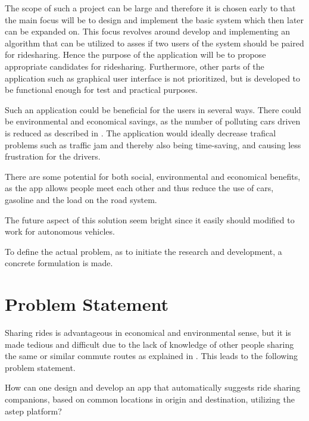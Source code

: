 The scope of such a project can be large and therefore it is chosen early to that the main focus will be to design and implement the basic system which then later can be expanded on.
This focus revolves around develop and implementing an algorithm that can be utilized to asses if two users of the system should be paired for ridesharing.
Hence the purpose of the application will be to propose appropriate candidates for ridesharing.
Furthermore, other parts of the application such as graphical user interface is not prioritized, but is developed to be functional enough for test and practical purposes.

Such an application could be beneficial for the users in several ways. There could be environmental and economical savings, as the number of polluting cars driven is reduced as described in \cite{doi:10.1080/01441647.2011.621557}. The application would ideally decrease trafical problems such as traffic jam and thereby also being time-saving, and causing less frustration for the drivers.

There are some potential for both social, environmental and economical benefits, as the app allows people meet each other and thus reduce the use of cars, gasoline and the load on the road system.

The future aspect of this solution seem bright since it easily should modified to work for autonomous vehicles.

To define the actual problem, as to initiate the research and development, a concrete formulation is made.
\section{Problem Statement}
Sharing rides is advantageous in economical and environmental sense, but it is made tedious and difficult due to the lack of knowledge of other people sharing the same or similar commute routes as explained in \cite{doi:10.1080/01441647.2011.621557}. This leads to the following problem statement.

{\addtolength{\leftskip}{10mm}\addtolength{\rightskip}{10mm}\noindent\hrulefill\it

\noindent How can one design and develop an app that automatically suggests ride sharing companions, based on common locations in origin and destination, utilizing the \gls{astep} platform? 

\noindent\hrulefill

}

